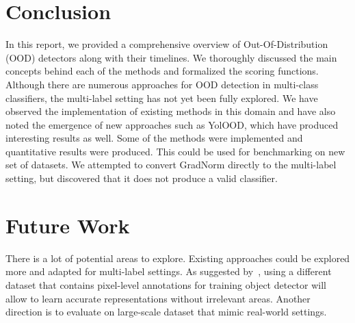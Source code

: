 \section{Conclusion}
In this report, we provided a comprehensive overview of Out-Of-Distribution (OOD) detectors along with their timelines. 
We thoroughly discussed the main concepts behind each of the methods and formalized the scoring functions. 
Although there are numerous approaches for OOD detection in multi-class classifiers, the multi-label setting has not yet been fully explored. 
We have observed the implementation of existing methods in this domain and have also noted the emergence of new approaches such as YolOOD, 
which have produced interesting results as well. Some of the methods were implemented and quantitative results were produced. 
This could be used for benchmarking on new set of datasets. 
We attempted to convert GradNorm directly to the multi-label setting, but discovered that it does not produce a valid classifier. 

\section{Future Work}
There is a lot of potential areas to explore.
Existing approaches could be explored more and adapted for multi-label settings.
As suggested by~\cite{Zolfi2022}, using a different dataset that contains pixel-level annotations for training object detector will allow to learn accurate representations without irrelevant areas.
Another direction is to evaluate on large-scale dataset that mimic real-world settings.~\cite{hendrycksScalingOutofDistributionDetection2022,Huang2021}
